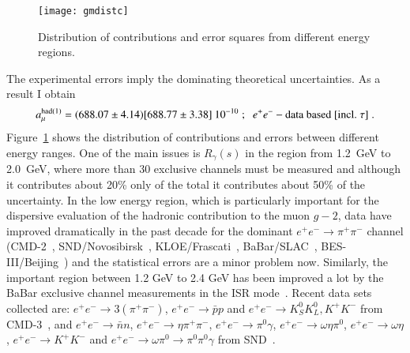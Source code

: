 \documentclass[epj,onecolumn]{webofc}
\newcommand{\epm}{e^+e^- }
\newcommand{\semis}{\;;\;\; }
\newcommand{\amu}{a_\mu }
\newcommand{\epo}{\;. }
\begin{document}
\begin{figure}
\centering
\texttt{[image: gmdistc]}
\caption{Distribution of contributions and error squares from different
energy regions.}
\label{fig:gm2dist}
\end{figure}
The experimental errors imply the dominating theoretical
uncertainties. As a result I obtain
\begin{equation}
\amu^{\mathrm{had}(1)}=(688.07\pm 4.14)[688.77\pm3.38]\:10^{-10}\semis
\epm-{\rm data \ based \ [incl.\ } \tau ]\epo
\label{LOHVP}
\end{equation}
Figure~\ref{fig:gm2dist} shows the distribution of contributions and
errors between different energy ranges.
One of the main issues is
$R_\gamma(s)$ in the region from 1.2~GeV to 2.0~GeV, where more than
30 exclusive channels must be measured and although it contributes
about 20\% only of the total it contributes about 50\% of the uncertainty.
In the low energy region, which is particularly important for the dispersive
evaluation of the hadronic contribution to the muon $g-2$, data have improved
dramatically in the past decade for the dominant $e^+e^- \to
\pi^+\pi^-$ channel (CMD-2~\cite{CMD203}, SND/Novosibirsk~\cite{SND06},
KLOE/Frascati~\cite{KLOE08,KLOE10,KLOE12},
BaBar/SLAC~\cite{BABARpipi},
BES-III/Beijing~\cite{BESIII}) and the statistical errors are a minor
problem now. Similarly, the important region between 1.2 GeV to 2.4 GeV
has been improved a lot by the BaBar exclusive channel measurements in the ISR
mode~\cite{BaBar05,BaBar11,Davier:2015bka,Davier:2016udg}.
Recent data sets collected are: $e^+e^-\to 3(\pi^+\pi^-)$, $e^+e^-\to
\bar{p}p$ and $e^+ e^- \to K^0_{S}K^0_{L},K^+K^-$ from
CMD-3~\cite{Akhmetshin:2013xc,Kozyrev:2016raz},
and $e^+e^-\to \bar{n}n$, $e^+e^-\to \eta \pi^+\pi^-$, $e^+e^-\to
\pi^0\gamma$, $e^+e^- \to \omega\eta\pi^0$, $e^+e^- \to \omega\eta$,
$e^+e^- \to K^+K^-$ and $e^+e^- \to \omega\pi^0 \to \pi^0\pi^0\gamma$ from
SND~\cite{Achasov:2014ncd,Aulchenko:2014vkn,Achasov:2016bfr}.
\end{document}
